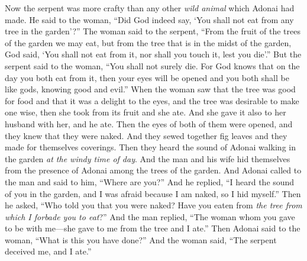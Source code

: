 \begin{biblechapter} %
 Now the serpent was more crafty than any other \textit{wild animal} which Adonai had made. He said to the woman, “Did God indeed say, ‘You shall not eat from any tree in the garden’?”
\verse The woman said to the serpent, “From the fruit of the trees of the garden we may eat,
\verse but from the tree that is in the midst of the garden, God said, ‘You shall not eat from it, nor shall you touch it, lest you die’.”
\verse But the serpent said to the woman, “You shall not surely die.
\verse For God knows that on the day you both eat from it, then your eyes will be opened and you both shall be like gods, knowing good and evil.”
\verse When the woman saw that the tree was good for food and that it was a delight to the eyes, and the tree was desirable to make one wise, then she took from its fruit and she ate. And she gave it also to her husband with her, and he ate.
\verse Then the eyes of both of them were opened, and they knew that they were naked. And they sewed together fig leaves and they made for themselves coverings.
\verse Then they heard the sound of Adonai walking in the garden \textit{at the windy time of day}. And the man and his wife hid themselves from the presence of Adonai among the trees of the garden.
\verse And Adonai called to the man and said to him, “Where are you?”
\verse And he replied, “I heard the sound of you in the garden, and I was afraid because I am naked, so I hid myself.”
\verse Then he asked, “Who told you that you were naked? Have you eaten from \textit{the tree from which I forbade you to eat}?”
\verse And the man replied, “The woman whom you gave to be with me—she gave to me from the tree and I ate.”
\verse Then Adonai said to the woman, “What is this you have done?” And the woman said, “The serpent deceived me, and I ate.”

\end{biblechapter}
